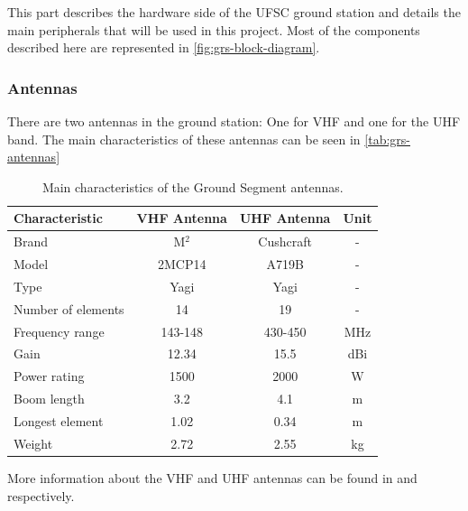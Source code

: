 This part describes the hardware side of the UFSC ground station and details the main peripherals that will be used in this project. Most of the components described here are represented in \autoref{fig:grs-block-diagram}.

\subsubsection{Antennas}

There are two antennas in the ground station: One for VHF and one for the UHF band. The main characteristics of these antennas can be seen in \autoref{tab:grs-antennas}

\begin{table}[!ht]
    \centering
    \begin{tabular}{lccc}
        \toprule[1.5pt]
        \textbf{Characteristic} & \textbf{VHF Antenna}  & \textbf{UHF Antenna}  & \textbf{Unit} \\
        \midrule
        Brand                   & M$^{2}$               & Cushcraft             & - \\
        Model                   & 2MCP14                & A719B                 & - \\
        Type                    & Yagi                  & Yagi                  & - \\
        Number of elements      & 14                    & 19                    & - \\
        Frequency range         & 143-148               & 430-450               & MHz \\
        Gain                    & 12.34                 & 15.5                  & dBi \\
        Power rating            & 1500                  & 2000                  & W \\
        Boom length             & 3.2                   & 4.1                   & m \\
        Longest element         & 1.02                  & 0.34                  & m \\
        Weight                  & 2.72                  & 2.55                  & kg \\
        \bottomrule[1.5pt]
    \end{tabular}
    \caption{Main characteristics of the Ground Segment antennas.}
    \label{tab:grs-antennas}
\end{table}

More information about the VHF and UHF antennas can be found in \cite{2mcp14} and \cite{a719b} respectively.

